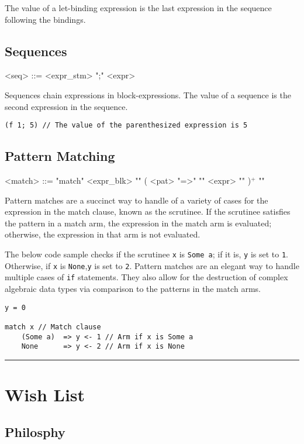 \documentclass{article}
\begin{document}
The value of a let-binding expression is the last expression in the sequence following the bindings.
\subsection{Sequences}
\begin{grammar}
<seq> ::= <expr_stm> ";" <expr>
\end{grammar}
Sequences chain expressions in block-expressions. The value of a sequence is the second expression in the sequence.
\begin{lstlisting}
(f 1; 5) // The value of the parenthesized expression is 5
\end{lstlisting}


\subsection{Pattern Matching}
\begin{grammar}
<match> ::=  "match" <expr_blk> "{" (  <pat> "=>" "{" <expr> "}" )$^{+}$ "}"
\end{grammar}

Pattern matches are a succinct way to handle of a variety of cases for the expression in the match clause, known as the scrutinee. If the scrutinee satisfies the pattern in a match arm, the expression in the match arm is evaluated; otherwise, the expression in that arm is not evaluated.

The below code sample checks if the scrutinee \texttt{x} is \texttt{Some a}; if it is, \texttt{y} is set to \texttt{1}. Otherwise, if \texttt{x} is \texttt{None},\texttt{y} is set to \texttt{2}. Pattern matches are an elegant way to handle multiple cases of \texttt{if} statements. They also allow for the destruction of complex algebraic data types via comparison to the patterns in the match arms.

\begin{lstlisting}
y = 0

match x // Match clause
    (Some a)  => y <- 1 // Arm if x is Some a
    None      => y <- 2 // Arm if x is None
\end{lstlisting}

\newpage

\hrule

\section{Wish List}

\subsection{Philosphy}
\end{document}
